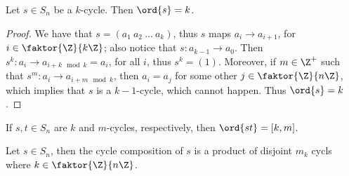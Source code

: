 \begin{lemma}\label{1.4.6}
    Let $s \in S_n$ be a $k$-cycle. Then $\ord{s}=k$.
\end{lemma}
\begin{proof}
    We have that $s=(a_1 \ a_2 \ \dots \ a_k)$, thus $s$ maps  $a_i
    \rightarrow a_{i+1}$, for $i \in \faktor{\Z}{k\Z}$; also notice that
    $s:a_{k-1} \rightarrow a_0$. Then $s^k:a_i \rightarrow a_{i+k
    \mod{k}}=a_i$, for all  $i$, thus  $s^k=(1)$. Moreover, if $m \in \Z^+$
    such that $s^m:a_i \rightarrow a_{i+m \mod{k}}$, then $a_i=a_j$ for
    some other  $j \in \faktor{\Z}{n\Z}$, which implies that $s$ is a
    $k-1$-cycle, which cannot happen. Thus $\ord{s}=k$.
\end{proof}
\begin{corollary}
    If $s,t \in S_n$ are  $k$ and $m$-cycles, respectively, then
    $\ord{st}=[k,m]$.
\end{corollary}
\begin{corollary}
    Let $s \in S_n$, then the cycle composition of  $s$ is a product of disjoint
     $m_k$ cycls where $k \in \faktor{\Z}{n\Z}$.
\end{corollary}

